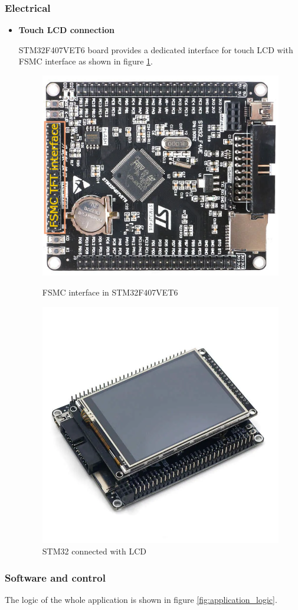 \subsubsection{Electrical}
\begin{itemize}
    \item \textbf{Touch LCD connection}
    \par
    STM32F407VET6 board provides a dedicated interface for touch LCD with FSMC interface as shown in figure \ref{fig:fsmc_interface}.
    \begin{figure}[H]
        \centering
        \includegraphics[width=.45\textwidth, height=.325\textheight]{Figures/STM32F407VET6.png}
        \caption[Load cells circuit]{FSMC interface in STM32F407VET6 \cite{mcu_lcd}}
        \includegraphics[width=.45\textwidth, height=.325\textheight]{Figures/stm32f407vet6_with_lcd.png}
        \caption[STM32 connected with LCD]{STM32 connected with LCD \cite{mcu_lcd}}
        \label{fig:fsmc_interface}
    \end{figure}
\end{itemize}

\subsubsection{Software and control}
The logic of the whole application is shown in figure \ref{fig:application_logic}.

